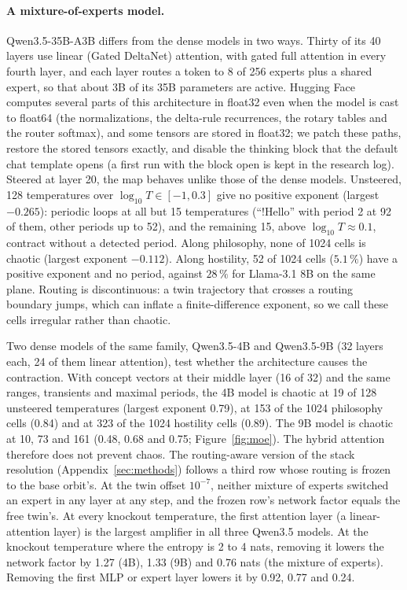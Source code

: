 \documentclass[11pt,letterpaper]{article}
\begin{document}
\paragraph{A mixture-of-experts model.} Qwen3.5-35B-A3B differs from the dense models in two ways. Thirty of its 40
layers use linear (Gated DeltaNet) attention, with gated full attention in every fourth layer, and each layer routes
a token to 8 of 256 experts plus a shared expert, so that about 3B of its 35B parameters are active. Hugging Face
computes several parts of this architecture in float32 even when the model is cast to float64 (the normalizations,
the delta-rule recurrences, the rotary tables and the router softmax), and some tensors are stored in float32; we
patch these paths, restore the stored tensors exactly, and disable the thinking block that the default chat template
opens (a first run with the block open is kept in the research log). Steered at layer 20, the map behaves unlike
those of the dense models. Unsteered, 128 temperatures over $\log_{10}T\in[-1,0.3]$ give no positive exponent (largest
$-0.265$): periodic loops at all but 15 temperatures (``!Hello'' with period 2 at 92 of them, other periods up to 52),
and the remaining 15, above $\log_{10}T\approx0.1$, contract without a detected period. Along philosophy, none of 1024
cells is chaotic (largest exponent $-0.112$). Along hostility, 52 of 1024 cells ($5.1\,\%$) have a positive exponent
and no period, against $28\,\%$ for Llama-3.1 8B on the same plane. Routing is discontinuous: a twin trajectory that
crosses a routing boundary jumps, which can inflate a finite-difference exponent, so we call these cells irregular
rather than chaotic.

Two dense models of the same family, Qwen3.5-4B and Qwen3.5-9B (32 layers each, 24 of them linear attention), test
whether the architecture causes the contraction. With concept vectors at their middle layer (16 of 32) and the same
ranges, transients and maximal periods, the 4B model is chaotic at 19 of 128 unsteered temperatures (largest exponent
0.79), at 153 of the 1024 philosophy cells (0.84) and at 323 of the 1024 hostility cells (0.89). The 9B model is
chaotic at 10, 73 and 161 (0.48, 0.68 and 0.75; Figure~\ref{fig:moe}). The hybrid attention therefore does not prevent
chaos. The routing-aware version of the stack resolution (Appendix~\ref{sec:methods}) follows a third row whose
routing is frozen to the base orbit's. At the twin offset $10^{-7}$, neither mixture of experts switched an expert in
any layer at any step, and the frozen row's network factor equals the free twin's. At every knockout temperature, the
first attention layer (a linear-attention layer) is the largest amplifier in all three Qwen3.5 models. At the knockout temperature where the entropy is 2 to
4 nats, removing it lowers the network factor by 1.27 (4B), 1.33 (9B) and 0.76 nats (the mixture of experts). Removing
the first MLP or expert layer lowers it by 0.92, 0.77 and 0.24.
\end{document}
